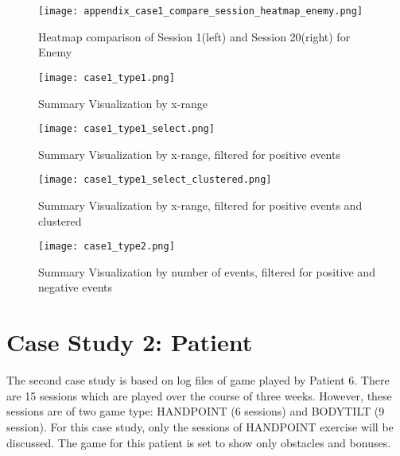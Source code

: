 \begin{figure}
\centering
\texttt{[image: appendix\_case1\_compare\_session\_heatmap\_enemy.png]}
\caption{Heatmap comparison of Session 1(left) and Session 20(right) for Enemy}
\label{fig:app1_heatmap_enemy}
\end{figure}

\begin{figure}
\centering
\texttt{[image: case1\_type1.png]}
\caption{Summary Visualization by x-range}
\label{fig:case1_type1}
\end{figure}

\begin{figure}
\centering
\texttt{[image: case1\_type1\_select.png]}
\caption{Summary Visualization by x-range, filtered for positive events}
\label{fig:case1_type1_select}
\end{figure}

\begin{figure}
\centering
\texttt{[image: case1\_type1\_select\_clustered.png]}
\caption{Summary Visualization by x-range, filtered for positive events and clustered}
\label{fig:case1_type1_select_c}
\end{figure}

\begin{figure}
\centering
\texttt{[image: case1\_type2.png]}
\caption{Summary Visualization by number of events, filtered for positive and negative events}
\label{fig:case1_type2}
\end{figure}

\section{Case Study 2: Patient}
The second case study is based on log files of game played by Patient 6. There are 15 sessions which are played over the course of three weeks. However, these sessions are of two game type: HANDPOINT (6 sessions) and BODYTILT (9 session). For this case study, only the sessions of HANDPOINT exercise will be discussed. The game for this patient is set to show only obstacles and bonuses.


